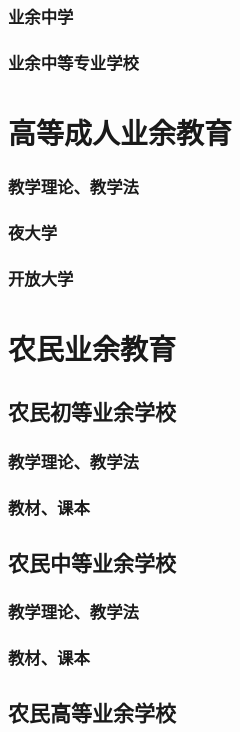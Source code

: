 \documentclass[UTF8]{../../ApplicationUniverse}
\begin{document}
    \subsubsection{业余中学}
    \subsubsection{业余中等专业学校}
\section{高等成人业余教育}
    \subsubsection{教学理论、教学法}
    \subsubsection{夜大学}
    \subsubsection{开放大学}
\section{农民业余教育}
    \subsection{农民初等业余学校}
        \subsubsection{教学理论、教学法}
        \subsubsection{教材、课本}
    \subsection{农民中等业余学校}
        \subsubsection{教学理论、教学法}
        \subsubsection{教材、课本}
    \subsection{农民高等业余学校}
\end{document}
